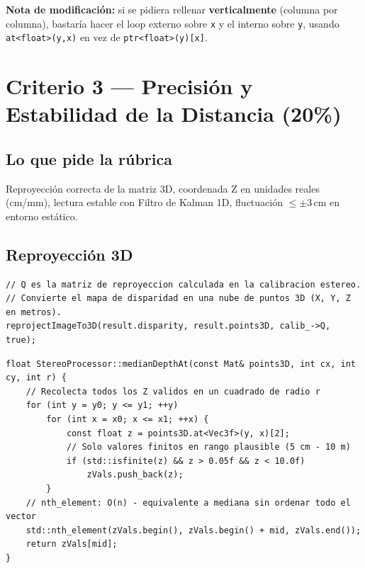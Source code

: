 \documentclass[11pt,a4paper]{article}
\begin{document}
\noindent\textbf{Nota de modificación:} si se pidiera rellenar \textbf{verticalmente} (columna por columna),
bastaría hacer el loop externo sobre \texttt{x} y el interno sobre \texttt{y}, usando
\texttt{at<float>(y,x)} en vez de \texttt{ptr<float>(y)[x]}.

\section{Criterio 3 — Precisión y Estabilidad de la Distancia (20\%)}

\subsection*{Lo que pide la rúbrica}
Reproyección correcta de la matriz 3D, coordenada Z en unidades reales (cm/mm),
lectura estable con Filtro de Kalman 1D, fluctuación $\leq \pm 3\,\text{cm}$ en entorno estático.

\subsection*{Reproyección 3D}

\begin{lstlisting}[caption={Paso 7: reprojectImageTo3D (línea 131)}]
// Q es la matriz de reproyeccion calculada en la calibracion estereo.
// Convierte el mapa de disparidad en una nube de puntos 3D (X, Y, Z en metros).
reprojectImageTo3D(result.disparity, result.points3D, calib_->Q, true);
\end{lstlisting}

\begin{lstlisting}[caption={Medición robusta: mediana de región 10x10 px}]
float StereoProcessor::medianDepthAt(const Mat& points3D, int cx, int cy, int r) {
    // Recolecta todos los Z validos en un cuadrado de radio r
    for (int y = y0; y <= y1; ++y)
        for (int x = x0; x <= x1; ++x) {
            const float z = points3D.at<Vec3f>(y, x)[2];
            // Solo valores finitos en rango plausible (5 cm - 10 m)
            if (std::isfinite(z) && z > 0.05f && z < 10.0f)
                zVals.push_back(z);
        }
    // nth_element: O(n) - equivalente a mediana sin ordenar todo el vector
    std::nth_element(zVals.begin(), zVals.begin() + mid, zVals.end());
    return zVals[mid];
}
\end{lstlisting}
\end{document}
